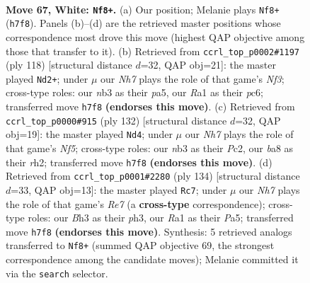 \documentclass[11pt]{article}
\begin{document}
\clearpage

\begin{figure}[p]\centering
\begin{subfigure}{0.46\textwidth}\centering
\resizebox{\linewidth}{!}{%
\newchessgame
\chessboard[
  setfen={b7/P6N/6k1/8/1p3P2/1n4PB/4K2P/R7 w - - 2 67},
  showmover=false,
  pgfstyle=straightmove, color=movearrow, markmove={h7-f8}
]}
\caption{}
\end{subfigure}\hfill
\begin{subfigure}{0.46\textwidth}\centering
\resizebox{\linewidth}{!}{%
\newchessgame
\chessboard[
  setfen={8/8/2pb4/p7/2P1k3/1P3N2/P1K5/8 w - - 17 60},
  showmover=false,
  pgfstyle=straightmove, color=movearrow, markmove={f3-d2}
]}
\caption{}
\end{subfigure}
\\[4pt]
\begin{subfigure}{0.46\textwidth}\centering
\resizebox{\linewidth}{!}{%
\newchessgame
\chessboard[
  setfen={4n3/3R4/6k1/5N2/8/1P1K1PP1/2P4r/8 w - - 3 67},
  showmover=false,
  pgfstyle=straightmove, color=movearrow, markmove={f5-d4}
]}
\caption{}
\end{subfigure}\hfill
\begin{subfigure}{0.46\textwidth}\centering
\resizebox{\linewidth}{!}{%
\newchessgame
\chessboard[
  setfen={r7/4R3/2bN1k2/P1p5/8/6Pp/7P/6K1 w - - 2 68},
  showmover=false,
  pgfstyle=straightmove, color=movearrow, markmove={e7-c7}
]}
\caption{}
\end{subfigure}
\caption{\textbf{Move 67, White: \texttt{Nf8+}.} (a) Our position; Melanie plays \texttt{Nf8+} (\texttt{h7f8}). Panels (b)--(d) are the retrieved master positions whose correspondence most drove this move (highest QAP objective among those that transfer to it). (b) Retrieved from \texttt{ccrl\_top\_p0002\#1197} (ply 118) [structural distance $d$=32, QAP obj=21]: the master played \texttt{Nd2+}; under $\mu$ our \emph{Nh7} plays the role of that game's \emph{Nf3}; cross-type roles: our \emph{n}b3 as their \emph{p}a5, our \emph{R}a1 as their \emph{p}c6; transferred move \texttt{h7f8} \textbf{(endorses this move)}. (c) Retrieved from \texttt{ccrl\_top\_p0000\#915} (ply 132) [structural distance $d$=32, QAP obj=19]: the master played \texttt{Nd4}; under $\mu$ our \emph{Nh7} plays the role of that game's \emph{Nf5}; cross-type roles: our \emph{n}b3 as their \emph{P}c2, our \emph{b}a8 as their \emph{r}h2; transferred move \texttt{h7f8} \textbf{(endorses this move)}. (d) Retrieved from \texttt{ccrl\_top\_p0001\#2280} (ply 134) [structural distance $d$=33, QAP obj=13]: the master played \texttt{Rc7}; under $\mu$ our \emph{Nh7} plays the role of that game's \emph{Re7} (a \textbf{cross-type} correspondence); cross-type roles: our \emph{B}h3 as their \emph{p}h3, our \emph{R}a1 as their \emph{P}a5; transferred move \texttt{h7f8} \textbf{(endorses this move)}. Synthesis: 5 retrieved analogs transferred to \texttt{Nf8+} (summed QAP objective 69, the strongest correspondence among the candidate moves); Melanie committed it via the \texttt{search} selector.}
\label{fig:thought-m132}
\end{figure}
\end{document}
